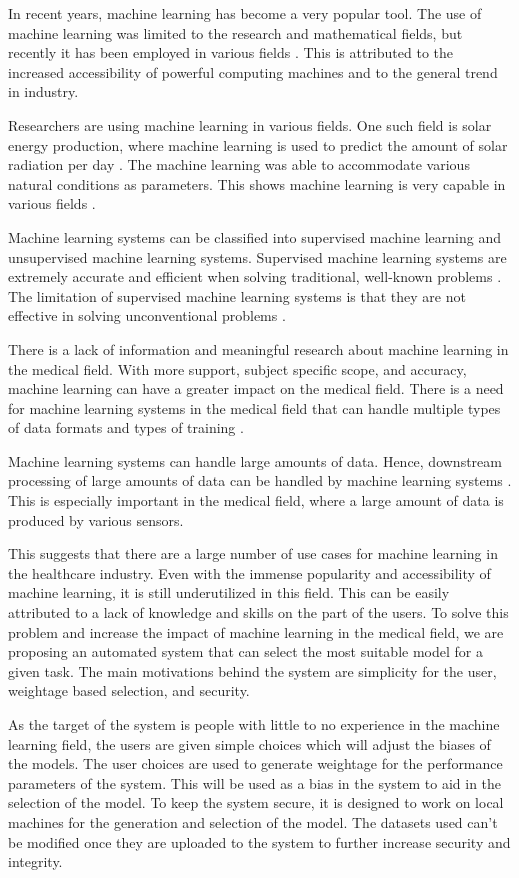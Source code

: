 \documentclass[a4paper,fleqn]{cas-dc}
\newcommand{\responsemod}{\color{black}}
\begin{document}
{\responsemod
    In recent years, machine learning has become a very popular tool. The use of machine learning was limited to the research and mathematical fields, but recently it has been employed in various fields \cite{ref_paper_36}. This is attributed to the increased accessibility of powerful computing machines and to the general trend in industry.

    Researchers are using machine learning in various fields. One such field is solar energy production, where machine learning is used to predict the amount of solar radiation per day \cite{ref_paper_7}. The machine learning was able to accommodate various natural conditions as parameters. This shows machine learning is very capable in various fields \cite{ref_paper_10,ref_paper_29}.

    Machine learning systems can be classified into supervised machine learning and unsupervised machine learning systems. Supervised machine learning systems are extremely accurate and efficient when solving traditional, well-known problems \cite{ref_paper_21}. The limitation of supervised machine learning systems is that they are not effective in solving unconventional problems \cite{ref_paper_10}.

    There is a lack of information and meaningful research about machine learning in the medical field. With more support, subject specific scope, and accuracy, machine learning can have a greater impact on the medical field. There is a need for machine learning systems in the medical field that can handle multiple types of data formats and types of training \cite{ref_paper_24}.

    Machine learning systems can handle large amounts of data. Hence, downstream processing of large amounts of data can be handled by machine learning systems \cite{ref_paper_12}. This is especially important in the medical field, where a large amount of data is produced by various sensors.

    This suggests that there are a large number of use cases for machine learning in the healthcare industry. Even with the immense popularity and accessibility of machine learning, it is still underutilized in this field. This can be easily attributed to a lack of knowledge and skills on the part of the users. To solve this problem and increase the impact of machine learning in the medical field, we are proposing an automated system that can select the most suitable model for a given task. The main motivations behind the system are simplicity for the user, weightage based selection, and security.

    As the target of the system is people with little to no experience in the machine learning field, the users are given simple choices which will adjust the biases of the models. The user choices are used to generate weightage for the performance parameters of the system. This will be used as a bias in the system to aid in the selection of the model. To keep the system secure, it is designed to work on local machines for the generation and selection of the model. The datasets used can't be modified once they are uploaded to the system to further increase security and integrity.
}
\end{document}
